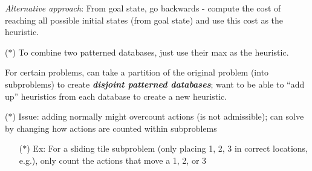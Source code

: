 \documentclass[12pt]{extarticle}
\theoremstyle{definition}
\theoremstyle{remark}
\newcommand{\pstart}[0]{\noindent}
\newcommand{\term}[1]{\noindent\textbf{\textit{#1}}}
\begin{document}
\vspace{6pt} \pstart
\textit{Alternative approach}: From goal state, go backwards - compute the cost of reaching all possible initial states (from goal state) and use this cost as the heuristic. 

\vspace{8pt} \pstart
($\ast$) To combine two patterned databases, just use their max as the heuristic.

\vspace{12pt}\pstart
For certain problems, can take a partition of the original problem (into subproblems) to create \term{disjoint patterned databases}; want to be able to ``add up'' heuristics from each database to create a new heuristic. 

\vspace{8pt}
\pstart
($\ast$) Issue: adding normally might overcount actions (is not admissible); can solve by changing how actions are counted within subproblems \begin{itemize}
    \item[($\ast$)] Ex: For a sliding tile subproblem (only placing 1, 2, 3 in correct locations, e.g.), only count the actions that move a 1, 2, or 3
\end{itemize}
\end{document}
